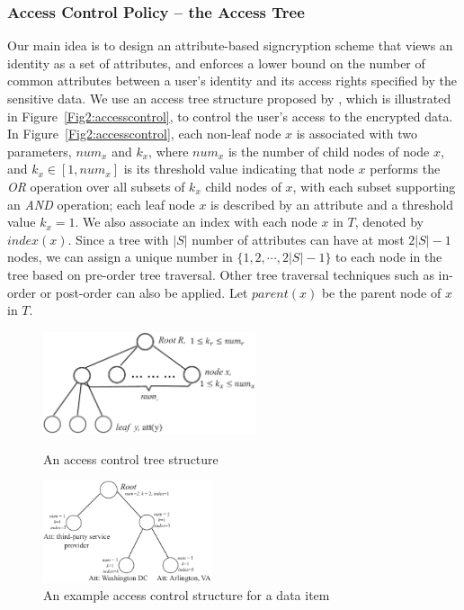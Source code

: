 \documentclass[letterpaper,12pt]{article}
\begin{document}
\subsubsection{Access Control Policy -- the Access Tree}
Our main idea is to design an attribute-based signcryption scheme that views an identity as a set of attributes, and
enforces a lower bound on the number of common attributes between a user's identity and its access rights specified by the sensitive
data. We use an access tree structure proposed by \cite{bethencourt2007ciphertext}, which is illustrated in Figure~\ref{Fig2:accesscontrol}, to control the user's access to the encrypted data. In Figure~\ref{Fig2:accesscontrol}, each non-leaf node $x$ is associated with two parameters, $num_x$ and $k_x$, where $num_x$ is the number of child nodes of node $x$, and $k_x\in[1,num_x]$ is its threshold value indicating that node $x$ performs the \emph{OR} operation over all subsets of $k_x$ child nodes of $x$, with each subset supporting an \emph{AND} operation; each leaf node $x$  is described by an attribute and a threshold value $k_x=1$. We also associate an index with each node $x$ in $T$, denoted by $index(x)$. Since a tree with $|S|$ number of attributes can have at most $2|S|-1$ nodes, we can assign a unique number in $\{1,2, \cdots, 2|S|-1\}$ to each node in the tree based on pre-order tree traversal. Other tree traversal techniques such as in-order or post-order can also be applied. Let $parent(x)$ be the parent node of $x$ in $T$.

\begin{figure}[t]\centering
\begin{minipage}[t]{0.45\linewidth}
\centering
\includegraphics[height=30mm]{accesscontrol}
\caption{An access control tree structure} \label{Fig2:accesscontrol}
\end{minipage}
\hspace{6mm}
\begin{minipage}[t]{0.45\linewidth}
\centering
\includegraphics[height=30mm]{accesscontrolexample}
\caption{An example access control structure for a data item} \label{Fig2:accesscontrolexample}
\end{minipage}
\hspace{6mm}
\end{figure}
\end{document}
